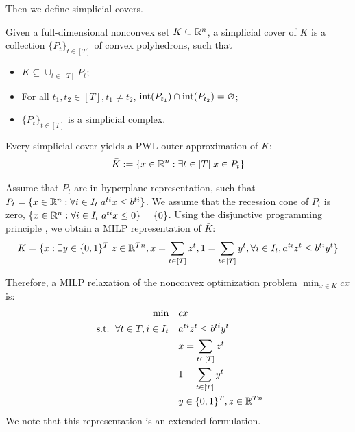 Then we  define simplicial covers.

\begin{definition}
    Given a full-dimensional nonconvex set $K \subseteq \mathbb R^n$, a simplicial cover of $K$ is a collection  $\{P_t\}_{t \in [T]}$ of convex polyhedrons, such that 
    \begin{itemize}
       \item $K \subseteq \cup_{t \in [T]} P_t$;
        \item For all $t_1, t_2 \in [T], t_1 \ne t_2$, $\operatorname{int}(P_{t_1}) \cap \operatorname{int}(P_{t_2}) = \varnothing$;
        \item $\{P_t\}_{t \in [T]}$ is a simplicial complex.
    \end{itemize}
\end{definition}



Every  simplicial cover  yields a PWL outer approximation of $K$:
\begin{equation}
\label{eq.pwlK}
    \bar{K}:=\{x \in \mathbb R^n: \exists t \in [T] \; x \in P_t \}
\end{equation}

Assume that $P_t$ are in hyperplane representation, such that $P_t = \{x \in \mathbb R^n: \forall i \in I_t \; a^{ti}x \le b^{ti}\}$. We assume that the recession cone of $P_t$ is zero, \ie $\{x \in \mathbb R^n: \forall i \in I_t \; a^{ti}x \le 0\} = \{0\}$.
Using the disjunctive programming principle \cite{Balas}, we obtain a MILP  representation of $\bar{K}$:
\begin{equation}
    \bar{K}=\{x:  \exists y \in \{0,1\}^T \; z \in \mathbb R^{Tn}, x=\sum_{t \in [T]}z^t, 1 = \sum_{t \in [T]}y^t,  \forall i \in I_t, a^{ti}z^t \le b^{ti} y^t\}
\end{equation}

Therefore, a MILP relaxation of the nonconvex optimization problem $\min_{x \in K}cx$ is:
 \begin{subequations}
    \label{pwlrel}
    \begin{align}
       \min &  \quad cx  \\
    \textup{ s.t. } \,   \forall t \in T, i \in I_t &  \quad a^{ti}z^t \le b^{ti} y^t\\
    & \quad x=\sum_{t \in [T]}z^t\\
    & \quad  1 = \sum_{t \in [T]}y^t  \\
       &  \quad  y \in \{0,1\}^T, z \in \mathbb R^{Tn}
    \end{align}
\end{subequations}
We note that this representation is an extended formulation.

